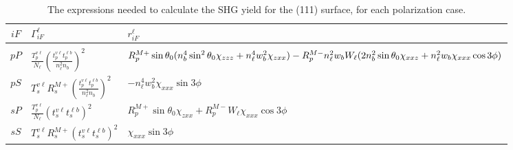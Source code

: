 \begin{table}[t]
\centering
\begin{tabular}{ | c | p{80pt} | p{210pt} | }
\hline
$iF$ & $\Gamma^{\ell}_{iF}$ & $r^{\ell}_{iF}$ \\
\hline
&&\\
$pP$ &
$\frac{T^{v\ell}_{p}}{N_{\ell}}
\left(\frac{t^{v\ell}_{p}t^{\ell b}_{p}}{n^{2}_{\ell}n_{b}}\right)^{2}$ &
{\small
$R^{M+}_{p}\sin\theta_{0}
(n^{4}_{b}\sin^{2}\theta_{0}\chi_{zzz} + n^{4}_{\ell}w^{2}_{b}\chi_{zxx})
\newline- R^{M-}_{p}n^{2}_{\ell}w_{b}W_{\ell}
(2n^{2}_{b}\sin\theta_{0}\chi_{xxz} + n^{2}_{\ell}w_{b}\chi_{xxx}\cos3\phi)$
}
\\[3pt]
$pS$ &
$T_{s}^{v\ell}R^{M+}_{s}
\left(\frac{t^{v\ell}_{p}t^{\ell b}_{p}}{n^{2}_{\ell}n_{b}}\right)^{2}$ &
$-n^{4}_{\ell}w^{2}_{b}\chi_{xxx}\sin3\phi$
\\[15pt]
$sP$ &
$\frac{T^{v\ell}_{p}}{N_{\ell}}\left(t^{v\ell}_{s}t^{\ell b}_{s}\right)^{2}$ &
$R^{M+}_{p}\sin\theta_{0}\chi_{zxx} + R^{M-}_{p}W_{\ell}\chi_{xxx}\cos3\phi$
\\[15pt]
$sS$ & 
$T_{s}^{v\ell}R^{M+}_{s}\left(t^{v\ell}_{s}t^{\ell b}_{s}\right)^{2}$ &
$\chi_{xxx}\sin3\phi$
\\[15pt]
\hline
\end{tabular}
\caption{The expressions needed to calculate the SHG yield for the (111)
surface, for each polarization case.\label{tab:summary}}
\end{table}
